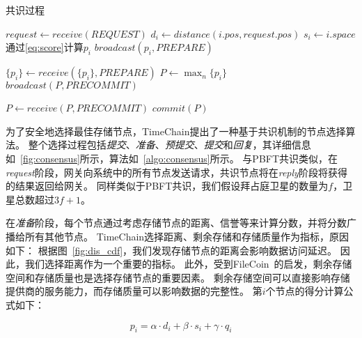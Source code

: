\begin{algorithm}
	\caption{共识过程}
	\label{algo:consensus}
	\begin{algorithmic}[1]
        \renewcommand{\algorithmicrequire}{ \textbf{准备}}
        \REQUIRE
            \STATE $request \gets \textit{receive}(REQUEST)$
                \STATE $d_i \gets \textit{distance}(i.pos, request.pos)$
                \STATE $s_i \gets i.space$
                \STATE 通过\autoref{eq:score}计算$p_i$
                \STATE $\textit{broadcast}(p_i, \textit{PREPARE})$
            \ENDIF

        \renewcommand{\algorithmicrequire}{ \textbf{预提交}}
        \REQUIRE
            \STATE $\{p_i\} \gets \textit{receive}(\{p_i\}, \textit{PREPARE})$
                \STATE $P \gets \max_n \{p_i\}$
                \STATE $\textit{broadcast}(P, \textit{PRECOMMIT})$
            \ENDIF

        \renewcommand{\algorithmicrequire}{ \textbf{提交}}
        \REQUIRE
            \STATE $P \gets \textit{receive}(P, \textit{PRECOMMIT})$
                \STATE $\textit{commit}(P)$
            \ENDIF
	\end{algorithmic}
\end{algorithm}

为了安全地选择最佳存储节点，TimeChain提出了一种基于共识机制的节点选择算法。
整个选择过程包括\textit{提交}、\textit{准备}、\textit{预提交}、\textit{提交}和\textit{回复}，其详细信息如~\autoref{fig:consensus}所示，算法如~\autoref{algo:consensus}所示。
与PBFT共识类似，在\textit{request}阶段，网关向系统中的所有节点发送请求，共识节点将在\textit{reply}阶段将获得的结果返回给网关。
同样类似于PBFT共识，我们假设拜占庭卫星的数量为$f$，卫星总数超过$3f+1$。

在\textit{准备}阶段，每个节点通过考虑存储节点的距离、信誉等来计算分数，并将分数广播给所有其他节点。
TimeChain选择距离、剩余存储和存储质量作为指标，原因如下：
根据图~\autoref{fig:dis_cdf}，我们发现存储节点的距离会影响数据访问延迟。
因此，我们选择距离作为一个重要的指标。
此外，受到FileCoin~\cite{bauer2022filecoin}的启发，剩余存储空间和存储质量也是选择存储节点的重要因素。
剩余存储空间可以直接影响存储提供商的服务能力，而存储质量可以影响数据的完整性。
第$i$个节点的得分计算公式如下：

\begin{equation} 
    \label{eq:score}
    p_i=\alpha\cdot d_i+\beta\cdot s_i+\gamma\cdot q_i
\end{equation}


